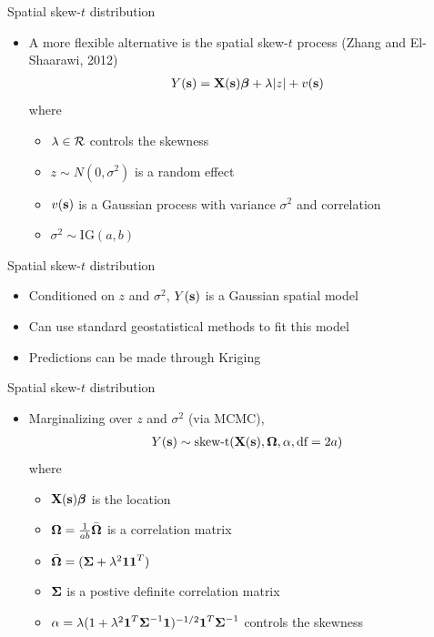 \documentclass{beamer}
\begin{document}
\begin{frame}{Spatial skew-$t$ distribution}
  \begin{itemize} \setlength{\itemsep}{1em}
    \item A more flexible alternative is the spatial skew-$t$ process (Zhang and El-Shaarawi, 2012)
    \begin{align*}
      Y(\mbox{\bf s}) = \mbox{\bf X}(\mbox{\bf s})\mbox{\boldmath $\beta$} + \lambda |z| + v(\mbox{\bf s})
    \end{align*}
    where
    \begin{itemize} \setlength{\itemsep}{0.25em}
      \item $\lambda \in {\cal R}$ controls the skewness
      \item $z \sim N(0, \sigma^2)$ is a random effect
      \item $v(\mbox{\bf s})$ is a Gaussian process with variance $\sigma^2$ and \Matern correlation
      \item $\sigma^2 \sim \text{IG}(a, b)$
    \end{itemize}
  \end{itemize}
\end{frame}

\begin{frame}{Spatial skew-$t$ distribution}
  \begin{itemize} \setlength{\itemsep}{1em}
    \item \alert{Conditioned} on $z$ and $\sigma^2$, $Y(\mbox{\bf s})$ is a Gaussian spatial model
    \item Can use standard geostatistical methods to fit this model
    \item Predictions can be made through Kriging
  \end{itemize}
\end{frame}

\begin{frame}{Spatial skew-$t$ distribution}
  \begin{itemize} \setlength{\itemsep}{1em}
    \item \alert{Marginalizing} over $z$ and $\sigma^2$ (via MCMC),
    \begin{align*}
      Y(\mbox{\bf s}) \sim \text{skew-t}(\mbox{\bf X}(\mbox{\bf s}), \mbox{\boldmath $\Omega$}, \alpha, \text{df}=2a)
    \end{align*}
    where
    \begin{itemize}
      \item $\mbox{\bf X}(\mbox{\bf s}) \mbox{\boldmath $\beta$}$ is the location
      \item $\mbox{\boldmath $\Omega$} = \frac{1}{ab} \bar{\mbox{\boldmath $\Omega$}}$ is a correlation matrix
      \item $\bar{\mbox{\boldmath $\Omega$}} = (\mbox{\boldmath $\Sigma$} + \lambda^2 \mbox{\boldmath $1$} \mbox{\boldmath $1$}^T)$
      \item $\mbox{\boldmath $\Sigma$}$ is a postive definite correlation matrix
      \item $\alpha = \lambda( 1 + \lambda^2 \mbox{\boldmath $1$}^T \mbox{\boldmath $\Sigma$}^{-1} \mbox{\boldmath $1$})^{-1/2} \mbox{\boldmath $1$}^T \mbox{\boldmath $\Sigma$}^{-1}$ controls the skewness
    \end{itemize}
  \end{itemize}
\end{frame}
\end{document}
